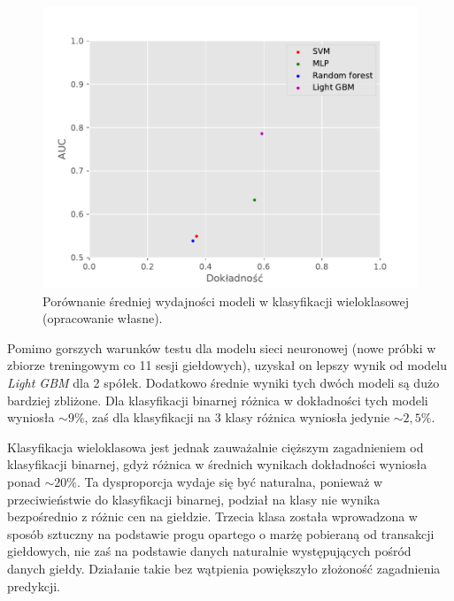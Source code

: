 \documentclass[a4paper, twoside, 11pt, openright]{article}
\begin{document}
\begin{figure}[H]
\centering \includegraphics[scale=0.9]{img/summary-discrete-summary.pdf}
\caption{Porównanie średniej wydajności modeli w klasyfikacji wieloklasowej (opracowanie własne).}
\label{img:summary-discrete}
\end{figure}


Pomimo gorszych warunków testu dla modelu sieci neuronowej (nowe próbki w zbiorze treningowym co 11 sesji giełdowych), uzyskał on lepszy wynik od modelu \textit{Light GBM} dla 2 spółek. Dodatkowo średnie wyniki tych dwóch modeli są dużo bardziej zbliżone. Dla klasyfikacji binarnej różnica w dokładności tych modeli wyniosła $\sim 9\%$, zaś dla klasyfikacji na 3 klasy różnica wyniosła jedynie $\sim 2,5\%$.

\bigskip

Klasyfikacja wieloklasowa jest jednak zauważalnie cięższym zagadnieniem od klasyfikacji binarnej, gdyż różnica w średnich wynikach dokładności wyniosła ponad $\sim 20\%$. Ta dysproporcja wydaje się być naturalna, ponieważ w przeciwieństwie do klasyfikacji binarnej, podział na klasy nie wynika bezpośrednio z różnic cen na giełdzie. Trzecia klasa została wprowadzona w sposób sztuczny na podstawie progu opartego o marżę pobieraną od transakcji giełdowych, nie zaś na podstawie danych naturalnie występujących pośród danych giełdy. Działanie takie bez wątpienia powiększyło złożoność zagadnienia predykcji.

\bigskip
\end{document}
